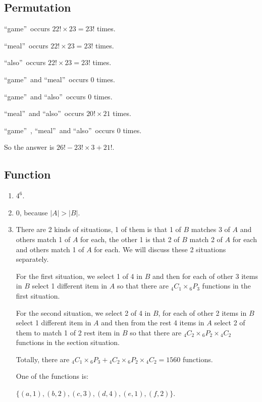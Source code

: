 \documentclass{sig-alternate-05-2015}
\begin{document}
\subsection{Permutation}
\textquotedblleft game\textquotedblright\ occurs $22! \times 23 = 23!$ times.

\textquotedblleft meal\textquotedblright\ occurs $22! \times 23 = 23!$ times.

\textquotedblleft also\textquotedblright\ occurs $22! \times 23 = 23!$ times.

\textquotedblleft game\textquotedblright\ and \textquotedblleft meal\textquotedblright\ occurs $0$ times.

\textquotedblleft game\textquotedblright\ and \textquotedblleft also\textquotedblright\ occurs $0$ times.

\textquotedblleft meal\textquotedblright\ and \textquotedblleft also\textquotedblright\ occurs $20! \times 21$ times.

\textquotedblleft game\textquotedblright\ , \textquotedblleft meal\textquotedblright\ and \textquotedblleft also\textquotedblright\ occurs $0$ times.

So the answer is $26! - 23! \times 3 + 21!$.

\newpage

\subsection{Function}
\begin{enumerate}
	\item $4^6$.
	\item $0$, because $|A| > |B|$.
	\item There are 2 kinds of situations, 1 of them is that 1 of $B$ matches 3 of $A$ and others match 1 of $A$ for each, the other 1 is that 2 of $B$ match 2 of $A$ for each and others match 1 of $A$ for each. We will discuss these 2 situations separately.
	
	For the first situation, we select 1 of 4 in $B$ and then for each of other 3 items in $B$ select 1 different item in $A$ so that there are ${}_4 C_1 \times {}_6 P_3$ functions in the first situation.
	
	For the second situation, we select 2 of 4 in $B$, for each of other 2 items in $B$ select 1 different item in $A$ and then from the rest 4 items in $A$ select 2 of them to match 1 of 2 rest item in $B$ so that there are ${}_4 C_2 \times {}_6 P_2 \times {}_4 C_2$ functions in the section situation.
	
	Totally, there are ${}_4 C_1 \times {}_6 P_3 + {}_4 C_2 \times {}_6 P_2 \times {}_4 C_2 = 1560$ functions.
	
	One of the functions is: 
	
	$\{(a, 1), (b, 2), (c, 3), (d, 4), (e, 1), (f, 2)\}$.
\end{enumerate}
\end{document}
